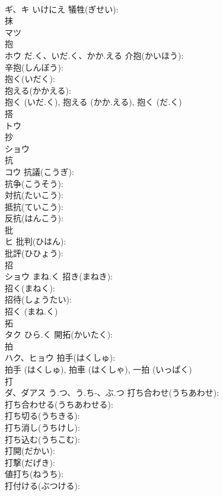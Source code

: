 \documentclass[8pt]{extreport}
\begin{document}
\begin{CJK}{UTF8}{min}
\\	ギ、キ	いけにえ	犠牲(ぎせい): 
\\	抹			
\\	マツ			
\\	抱			
\\	ホウ	だ.く、いだ.く、かか.える	介抱(かいほう): 
\\	辛抱(しんぼう): 
\\	抱く(いだく): 
\\	抱える(かかえる): 
\\	抱く (いだ.く), 抱える (かか.える), 抱く (だ.く)
\\	搭			
\\	トウ			
\\	抄			
\\	ショウ			
\\	抗			
\\	コウ		抗議(こうぎ): 
\\	抗争(こうそう): 
\\	対抗(たいこう): 
\\	抵抗(ていこう): 
\\	反抗(はんこう): 
\\	批			
\\	ヒ		批判(ひはん): 
\\	批評(ひひょう): 
\\	招			
\\	ショウ	まね.く	招き(まねき): 
\\	招く(まねく): 
\\	招待(しょうたい): 
\\	招く (まね.く)
\\	拓			
\\	タク	ひら.く	開拓(かいたく): 
\\	拍			
\\	ハク、ヒョウ		拍手(はくしゅ): 
\\	拍手 (はくしゅ), 拍車 (はくしゃ), 一拍 (いっぱく)
\\	打			
\\	ダ、ダアス	う.つ、う.ち-、ぶ.つ	打ち合わせ(うちあわせ): 
\\	打ち合わせる(うちあわせる): 
\\	打ち切る(うちきる): 
\\	打ち消し(うちけし): 
\\	打ち込む(うちこむ): 
\\	打開(だかい): 
\\	打撃(だげき): 
\\	値打ち(ねうち): 
\\	打付ける(ぶつける): 

\end{CJK}
\end{document}
